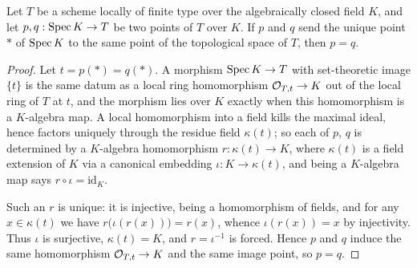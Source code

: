 \begin{lemma}
  \label{pa-lem:point_ext}
  \leanok

  Let \(T\) be a scheme locally of finite type over the algebraically closed field \(K\), and
  let \(p, q : \operatorname{Spec} K \to T\) be two points of \(T\) over \(K\). If \(p\) and \(q\) send the
  unique point \(*\) of \(\operatorname{Spec} K\) to the same point of the topological space of \(T\), then
  \(p = q\).
\end{lemma}
\begin{proof}
  \leanok
  Let \(t = p(*) = q(*)\). A morphism \(\operatorname{Spec} K \to T\) with set-theoretic image \(\{t\}\) is
  the same datum as a local ring homomorphism \(\mathcal{O}_{T,t} \to K\) out of the local ring of
  \(T\) at \(t\), and the morphism lies over \(K\) exactly when this homomorphism is a
  \(K\)-algebra map. A local homomorphism into a field kills the maximal ideal, hence factors
  uniquely through the residue field \(\kappa(t)\); so each of \(p\), \(q\) is determined by
  a \(K\)-algebra homomorphism \(r : \kappa(t) \to K\), where \(\kappa(t)\) is a field
  extension of \(K\) via a canonical embedding \(\iota : K \to \kappa(t)\), and being a
  \(K\)-algebra map says \(r \circ \iota = \mathrm{id}_K\).

  Such an \(r\) is unique: it is injective, being a homomorphism of fields, and for any
  \(x \in \kappa(t)\) we have \(r\bigl(\iota(r(x))\bigr) = r(x)\), whence
  \(\iota(r(x)) = x\) by injectivity. Thus \(\iota\) is surjective, \(\kappa(t) = K\), and
  \(r = \iota^{-1}\) is forced. Hence \(p\) and \(q\) induce the same homomorphism
  \(\mathcal{O}_{T,t} \to K\) and the same image point, so \(p = q\).
\end{proof}


